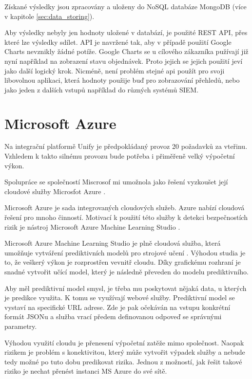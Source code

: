 \documentclass[thesis=M,czech]{FITthesis}[2012/10/20]
\begin{document}
	Získané výsledky jsou zpracovány a uloženy do NoSQL databáze MongoDB (více v kapitole \ref{sec:data_storing}).
	
	Aby výsledky nebyly jen hodnoty uložené v databází, je použité REST API, přes které lze výsledky sdílet. API je navržené tak, aby v případě použití Google Charts nevznikly žádné potíže. Google Charts se u cílového zákazníka pužívají již nyní například na zobrazení stavu objednávek. Proto jejich se jejich použití jeví jako další logický krok. Nicméně, není problém stejné api použít pro svoji libovolnou aplikaci, která hodnoty použije buď pro zobrazování přehledů, nebo jako jeden z dalších vstupů například do různých systémů SIEM.
	
	\section{Microsoft Azure}
		\label{sec:ms_azure}
		Na integrační platformě Unify \cite{unify} je předpokládaný provoz 20 požadavků za vteřinu. Vzhledem k takto silnému provozu bude potřeba i přiměřeně velký výpočetní výkon. 
			
		Spolupráce se společností Miscrosof \cite{microsoft} mi umožnola jako řešení vyzkoušet její cloudové služby Microsfot Azure \cite{msAzure}.
			
		Microsoft Azure je sada integrovaných cloudových služeb. Azure nabízí cloudová řešení pro mnoho činností. Motivací k použití této služby k detekci bezpečnostích rizik je nástroj Microsoft Azure Machine Learning Studio \cite{msAzureStudio}.
			
		Microsoft Azure Machine Learning Studio je plně cloudová služba, která umožňuje vytváření prediktivních modelů pro strojové učení \cite{msAzureStudio}. Výhodou studia je to, že veškerý výkon je rozprostřen vevnitř cloudu. Díky grafickému rozhraní je snadné vytvořit učící model, který je následně převeden do modelu prediktivního.
			
		Aby měl prediktivní model smysl, je třeba mu poskytovat nějaká data, u kterých je predikce využita. K tomu se využívají webové služby.
		Prediktivní model se vystaví na specifické URL adrese. Zde je pak očekáván na vstupu konkrétní formát JSONu a služba vrací předem definovanou odpoveď se správnými parametry.
		
		Výhodou využití cloudu je přenesení výpočetní zatěže mimo společnost. Naopak rizikem je problém s konektivitou, který může vytvořit výpadek služby a nebude tedy možné po tuto dobu predikovat rizika. Jednou z možností, jak řešit takové riziko je nechat přenést instanci MS Azure do své sítě.
		
\end{document}
